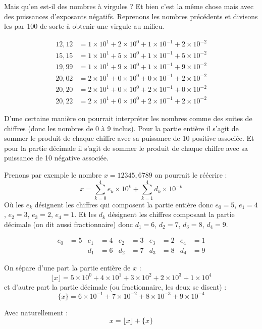 \documentclass[a4paper, 11pt, twoside]{article}
\begin{document}
Mais qu'en est-il des nombres à virgules ? Et bien c'est la même
chose mais avec des puissances d'exposants négatifs. Reprenons les
nombres précédents et divisons les par 100 de sorte à obtenir une
virgule au milieu.

\begin{align*}
12,12 &= 1\times 10^1 + 2\times 10^0 + 1\times 10^{-1} + 2\times 10^{-2}\\
15,15 &= 1\times 10^1 + 5\times 10^0 + 1\times 10^{-1} + 5\times 10^{-2}\\
19,99 &= 1\times 10^1 + 9\times 10^0 + 1\times 10^{-1} + 9\times 10^{-2}\\
20,02 &= 2\times 10^1 + 0\times 10^0 + 0\times 10^{-1} + 2\times 10^{-2}\\
20,20 &= 2\times 10^1 + 0\times 10^0 + 2\times 10^{-1} + 0\times 10^{-2}\\
20,22 &= 2\times 10^1 + 0\times 10^0 + 2\times 10^{-1} + 2\times 10^{-2}
\end{align*}

D'une certaine manière on pourrait interpréter les nombres comme
des suites de chiffres (donc les nombres de 0 à 9 inclus). Pour la
partie entière il s'agit de sommer le produit de chaque chiffre
avec sa puissance de 10 positive associée. Et pour la partie
décimale il s'agit de sommer le produit de chaque chiffre avec sa
puissance de 10 négative associée.

Prenons par exemple le nombre \(x = 12345,6789\) on pourrait le
réécrire : \[x = \sum_{k = 0}^4e_k\times 10^k + \sum_{k =
    1}^4d_k\times 10^{-k}\]
Où les \(e_k\) désignent les chiffres qui composent la partie
entière donc \(e_0 = 5\), \(e_1 = 4\), \(e_2 = 3\), \(e_3 = 2\), \(e_4 =
    1\). Et les \(d_k\) désignent les chiffres composant la partie
décimale (on dit aussi fractionnaire) donc \(d_1 = 6\), \(d_2 = 7\),
\(d_3 = 8\), \(d_4 = 9\).

\begin{align*}
e_0 &= 5 & e_1 &= 4 & e_2 &= 3 & e_3 &= 2 & e_4 &= 1\\
    &    & d_1 &= 6 & d_2 &= 7 & d_3 &= 8 & d_4 &= 9
\end{align*}

On sépare d'une part la partie entière de \(x\) :
\[\lfloor x \rfloor = 5\times 10^0 + 4\times 10^1 + 3\times 10^2 + 2\times 10^3 +
    1\times 10^4\]
et d'autre part la partie décimale (ou fractionnaire, les deux se
disent) :
\[\{ x \} = 6\times 10^{-1} + 7\times 10^{-2} + 8\times 10^{-3} +
    9\times 10^{-4}\]

Avec naturellement :
\[x = \lfloor x \rfloor + \{ x \}\]
\end{document}
